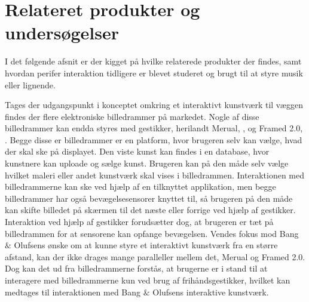 \section{Relateret produkter og undersøgelser}
\label{RelateretProdukterOgUndersoegelser}

I det følgende afsnit er der kigget på hvilke relaterede produkter der findes, samt hvordan perifer interaktion tidligere er blevet studeret og brugt til at styre musik eller lignende.

Tages der udgangspunkt i konceptet omkring et interaktivt kunstværk til væggen findes der flere elektroniske billedrammer på markedet. Nogle af disse billedrammer kan endda styres med gestikker, herilandt Merual, \parencite{WEB:Meural}, og Framed 2.0, \parencite{WEB:Framed2.0}. Begge disse er billedrammer er en platform, hvor brugeren selv kan vælge, hvad der skal ske på displayet. Den viste kunst kan findes i en database, hvor kunstnere kan uploade og sælge kunst. Brugeren kan på den måde selv vælge hvilket maleri eller andet kunstværk skal vises i billedrammen. Interaktionen med billedrammerne kan ske ved hjælp af en tilknyttet applikation, men begge billedrammer har også bevægelsesensorer knyttet til, så brugeren på den måde kan skifte billedet på skærmen til det næste eller forrige ved hjælp af gestikker. Interaktion ved hjælp af gestikker forudsætter dog, at brugeren er tæt på billedrammen for at sensorene kan opfange bevægelsen. Vendes fokus mod Bang $\&$ Olufsens ønske om at kunne styre et interaktivt kunstværk fra en større afstand, kan der ikke drages mange paralleller mellem det, Merual og Framed 2.0. Dog kan det ud fra billedrammerne forstås, at brugerne er i stand til at interagere med billedrammerne kun ved brug af frihåndsgestikker, hvilket kan medtages til interaktionen med Bang $\&$ Olufsens interaktive kunstværk.

